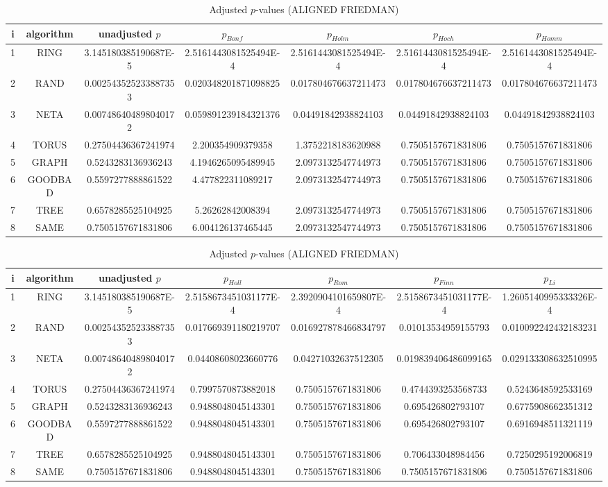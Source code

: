 \documentclass[a4paper,10pt]{article}
\begin{document}
\begin{landscape}
\begin{table}[!htp]
\centering\scriptsize
\caption{Adjusted $p$-values (ALIGNED FRIEDMAN)}
\begin{tabular}{ccccccc}
i&algorithm&unadjusted $p$&$p_{Bonf}$&$p_{Holm}$&$p_{Hoch}$&$p_{Homm}$\\
\hline
1& RING&3.145180385190687E-5&2.5161443081525494E-4&2.5161443081525494E-4&2.5161443081525494E-4&2.5161443081525494E-4\\
2& RAND&0.002543525233887353&0.020348201871098825&0.017804676637211473&0.017804676637211473&0.017804676637211473\\
3& NETA&0.007486404898040172&0.059891239184321376&0.04491842938824103&0.04491842938824103&0.04491842938824103\\
4& TORUS&0.27504436367241974&2.200354909379358&1.3752218183620988&0.7505157671831806&0.7505157671831806\\
5& GRAPH&0.5243283136936243&4.1946265095489945&2.0973132547744973&0.7505157671831806&0.7505157671831806\\
6& GOODBAD&0.5597277888861522&4.477822311089217&2.0973132547744973&0.7505157671831806&0.7505157671831806\\
7& TREE&0.6578285525104925&5.26262842008394&2.0973132547744973&0.7505157671831806&0.7505157671831806\\
8& SAME&0.7505157671831806&6.004126137465445&2.0973132547744973&0.7505157671831806&0.7505157671831806\\
\hline
\end{tabular}
\end{table}

\begin{table}[!htp]
\centering\scriptsize
\caption{Adjusted $p$-values (ALIGNED FRIEDMAN)}
\begin{tabular}{ccccccc}
i&algorithm&unadjusted $p$&$p_{Holl}$&$p_{Rom}$&$p_{Finn}$&$p_{Li}$\\
\hline
1& RING&3.145180385190687E-5&2.5158673451031177E-4&2.3920904101659807E-4&2.5158673451031177E-4&1.2605140995333326E-4\\
2& RAND&0.002543525233887353&0.017669391180219707&0.016927878466834797&0.01013534959155793&0.010092242432183231\\
3& NETA&0.007486404898040172&0.04408608023660776&0.04271032637512305&0.019839406486099165&0.029133308632510995\\
4& TORUS&0.27504436367241974&0.7997570873882018&0.7505157671831806&0.4744393253568733&0.5243648592533169\\
5& GRAPH&0.5243283136936243&0.9488048045143301&0.7505157671831806&0.695426802793107&0.6775908662351312\\
6& GOODBAD&0.5597277888861522&0.9488048045143301&0.7505157671831806&0.695426802793107&0.6916948511321119\\
7& TREE&0.6578285525104925&0.9488048045143301&0.7505157671831806&0.706433048984456&0.7250295192006819\\
8& SAME&0.7505157671831806&0.9488048045143301&0.7505157671831806&0.7505157671831806&0.7505157671831806\\
\hline
\end{tabular}
\end{table}



\end{landscape}
\end{document}
